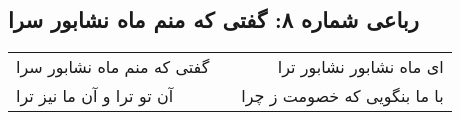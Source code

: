 \begin{center}
\section*{رباعی شماره ۸: گفتی که منم ماه نشابور سرا}
\label{sec:sh008}
\begin{longtable}{l p{0.5cm} r}
گفتی که منم ماه نشابور سرا
&&
ای ماه نشابور نشابور ترا
\\
آن تو ترا و آن ما نیز ترا
&&
با ما بنگویی که خصومت ز چرا
\\
\end{longtable}
\end{center}
